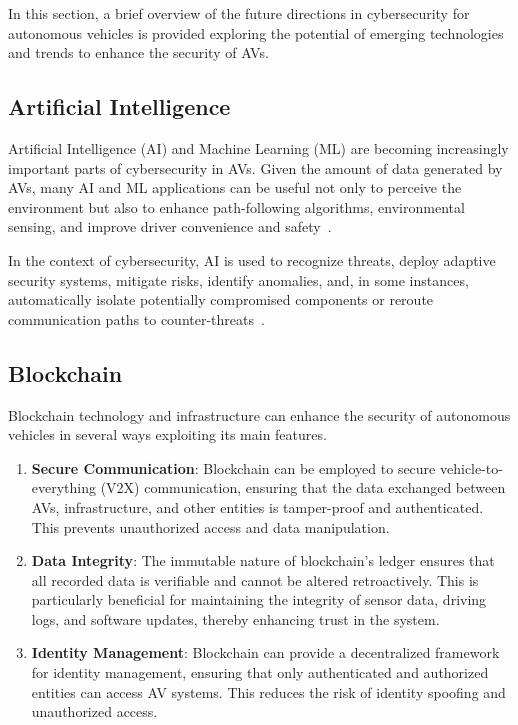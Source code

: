 In this section, a brief overview of the future directions in cybersecurity for autonomous vehicles is provided
exploring the potential of emerging technologies and trends to enhance the security of AVs.

\subsection{Artificial Intelligence}\label{subsec:artificial-intelligence}
Artificial Intelligence (AI) and Machine Learning (ML)
are becoming increasingly important parts of cybersecurity in AVs.
Given the amount of data generated by AVs,
many AI and ML applications can be useful not only to perceive the environment
but also to enhance path-following algorithms, environmental sensing,
and improve driver convenience and safety~\cite{giannaros2023autonomous}.

In the context of cybersecurity, AI is used to recognize threats,
deploy adaptive security systems, mitigate risks, identify anomalies,
and, in some instances,
automatically isolate potentially compromised components
or reroute communication paths to counter-threats~\cite{durlik2022cybersecurity}.

\subsection{Blockchain}\label{subsec:blockchain}

Blockchain technology and infrastructure can enhance the security of autonomous vehicles in several ways exploiting its main features.

\begin{enumerate}
    \item \textbf{Secure Communication}: Blockchain can be employed to secure vehicle-to-everything (V2X) communication,
    ensuring that the data exchanged between AVs, infrastructure, and other entities is tamper-proof and authenticated.
    This prevents unauthorized access and data manipulation.
    \item \textbf{Data Integrity}: The immutable nature of blockchain’s ledger ensures that all recorded data is verifiable
    and cannot be altered retroactively.
    This is particularly beneficial for maintaining the integrity of sensor data, driving logs, and software updates,
    thereby enhancing trust in the system.
    \item \textbf{Identity Management}: Blockchain can provide a decentralized framework for identity management,
    ensuring that only authenticated and authorized entities can access AV systems.
    This reduces the risk of identity spoofing and unauthorized access.
\end{enumerate}

